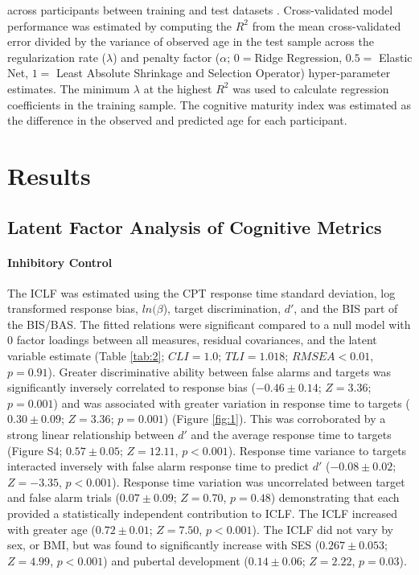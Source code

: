 \documentclass{article}%
\begin{document}
across participants between training and test datasets \citep{FriedmanHastieTibshirani2010, friedman2009glmnet}. Cross-validated model performance was estimated by computing the $R^2$ from the mean cross-validated error divided by the variance of observed age in the test sample across the regularization rate ($\lambda$) and penalty factor ($\alpha$; $0 = $Ridge Regression, $0.5 = $ Elastic Net, $1 =$ Least Absolute Shrinkage and Selection Operator) hyper-parameter estimates. The minimum $\lambda$ at the highest $R^2$ was used to calculate regression coefficients in the training sample. The cognitive maturity index was estimated as the difference in the observed and predicted age for each participant. 
\section*{Results} 
\subsection*{Latent Factor Analysis of Cognitive Metrics} 
\paragraph*{Inhibitory Control} 
The ICLF  was estimated using the CPT response time standard deviation, log transformed response bias, $ln(\beta$), target discrimination, $d'$, and the BIS part of the BIS/BAS. The fitted relations were significant compared to a null model with 0 factor loadings between all measures, residual covariances, and the latent variable estimate (Table \ref{tab:2}; $CLI = 1.0$; $TLI = 1.018$; $RMSEA < 0.01$, $p = 0.91$). Greater discriminative ability between false alarms and targets was significantly inversely correlated to response bias ($-0.46\pm0.14$; $Z=3.36$; $p=0.001$) and was associated with greater variation in response time to targets ($0.30\pm0.09$; $Z=3.36$; $p=0.001$) (Figure \ref{fig:1}). This was corroborated by a strong linear relationship between $d'$ and the average response time to targets (Figure S4; $0.57\pm0.05$; $Z=12.11$, $p<0.001$). Response time variance to targets interacted inversely with false alarm response time to predict $d'$ ($-0.08\pm0.02$;  $Z=-3.35$, $p < 0.001$). Response time variation was uncorrelated between target and false alarm trials ($0.07\pm0.09$; $Z=0.70$, $p=0.48$) demonstrating that each provided a statistically independent contribution to ICLF. The ICLF increased with greater age ($0.72\pm0.01$; $Z=7.50$, $p<0.001$). The ICLF did not vary by sex, or BMI, but was found to significantly increase with SES ($0.267\pm0.053$; $Z=4.99$, $p<0.001$) and pubertal development ($0.14\pm0.06$; $Z=2.22$, $p=0.03$). 
\end{document}

